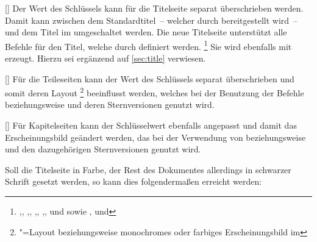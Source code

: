 \documentclass[%
  english,ngerman,%
  headings=optiontoheadandtoc,captions=tableheading,numbers=noenddot,%
  chapterpage,cdfoot,%
]{tudscrman}
\begin{document}
\begin{Declaration}{[\PSet]}
\printdeclarationlist%
%
%
Der Wert des Schlüssels  kann für die Titelseite separat 
überschrieben werden. Damit kann zwischen dem Standardtitel~-- welcher durch
\KOMAScript{} bereitgestellt wird~-- und dem Titel im \CD umgeschaltet 
werden. Die neue Titelseite unterstützt alle Befehle für den Titel, welche durch
\KOMAScript{} definiert werden.%
\footnote{\raggedright%
  ,,
  ,,
  ,,
  ,,
   und  sowie
  ,
  und 
}
Sie wird ebenfalls mit  erzeugt. Hierzu sei ergänzend auf
\autoref{sec:title} verwiesen.
\end{Declaration}

\begin{Declaration}{[\PSet]}
\printdeclarationlist%
%
%
Für die Teileseiten kann der Wert des Schlüssels  separat 
überschrieben und somit deren Layout%
\footnote{\label{fn:layout}%
  \KOMAScript"=Layout beziehungsweise monochromes oder farbiges Erscheinungsbild 
  im \CD%
}
beeinflusst werden, welches bei der Benutzung der Befehle  
beziehungsweise  und deren Sternversionen genutzt wird.
\end{Declaration}

\begin{Declaration}{[\PSet]}
\printdeclarationlist%
%
%
Für Kapitelseiten kann der Schlüsselwert  ebenfalls angepasst und 
damit das Erscheinungsbild geändert werden, das bei der 
Verwendung von  beziehungsweise  und den 
dazugehörigen Sternversionen genutzt wird.
\end{Declaration}

\begin{Example}
Soll die Titelseite in Farbe, der Rest des Dokumentes allerdings in schwarzer 
Schrift gesetzt werden, so kann dies folgendermaßen erreicht werden:
\end{Example}
\end{document}
